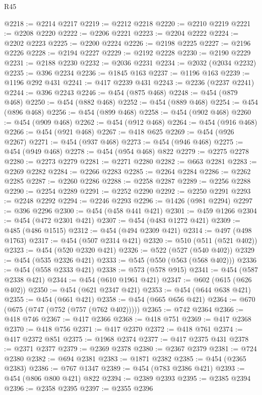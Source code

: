 \begin{lexlean}{R45}
\begin{coremodule}
@2218 := @2214 @2217
@2219 := @2212 @2218
@2220 := @2210 @2219
@2221 := @2208 @2220
@2222 := @2206 @2221
@2223 := @2204 @2222
@2224 := @2202 @2223
@2225 := @2200 @2224
@2226 := @2198 @2225
@2227 := @2196 @2226
@2228 := @2194 @2227
@2229 := @2192 @2228
@2230 := @2190 @2229
@2231 := @2188 @2230
@2232 := @2036 @2231
@2234 := @2032 (@2034 @2232)
@2235 := @396 @2234
@2236 := @1845 @163
@2237 := @1196 @163
@2239 := @1196 @292 @431
@2241 := @417 @2239 @431
@2243 := @2236 (@2237 @2241)
@2244 := @396 @2243
@2246 := @454 (@875 @468)
@2248 := @454 (@879 @468)
@2250 := @454 (@882 @468)
@2252 := @454 (@889 @468)
@2254 := @454 (@896 @468)
@2256 := @454 (@899 @468)
@2258 := @454 (@902 @468)
@2260 := @454 (@909 @468)
@2262 := @454 (@912 @468)
@2264 := @454 (@916 @468)
@2266 := @454 (@921 @468)
@2267 := @418 @625
@2269 := @454 (@926 @2267)
@2271 := @454 (@937 @468)
@2273 := @454 (@946 @468)
@2275 := @454 (@949 @468)
@2278 := @454 (@954 @468) @822
@2279 := @2275 @2278
@2280 := @2273 @2279
@2281 := @2271 @2280
@2282 := @663 @2281
@2283 := @2269 @2282
@2284 := @2266 @2283
@2285 := @2264 @2284
@2286 := @2262 @2285
@2287 := @2260 @2286
@2288 := @2258 @2287
@2289 := @2256 @2288
@2290 := @2254 @2289
@2291 := @2252 @2290
@2292 := @2250 @2291
@2293 := @2248 @2292
@2294 := @2246 @2293
@2296 := @1426 (@981 @2294)
@2297 := @396 @2296
@2300 := @454 (@458 @441 @421)
@2301 := @459 @1266
@2304 := @454 (@472 @2301 @421)
@2307 := @454 (@483 @1272 @421)
@2309 := @485 (@486 @1515)
@2312 := @454 (@494 @2309 @421)
@2314 := @497 (@498 @1763)
@2317 := @454 (@507 @2314 @421)
@2320 := @510 (@511 (@521 @402))
@2323 := @454 (@520 @2320 @421)
@2326 := @522 (@527 (@540 @402))
@2329 := @454 (@535 @2326 @421)
@2333 := @545 (@550 (@563 (@568 @402)))
@2336 := @454 (@558 @2333 @421)
@2338 := @573 (@578 @915)
@2341 := @454 (@587 @2338 @421)
@2344 := @454 (@610 @1961 @421)
@2347 := @602 (@615 (@626 @402))
@2350 := @454 (@621 @2347 @421)
@2353 := @454 (@644 @638 @421)
@2355 := @454 (@661 @421)
@2358 := @454 (@665 @656 @421)
@2364 := @670 (@675 (@747 (@752 (@757 (@762 @402)))))
@2365 := @742 @2364
@2366 := @418 @746
@2367 := @417 @2366
@2368 := @418 @751
@2369 := @417 @2368
@2370 := @418 @756
@2371 := @417 @2370
@2372 := @418 @761
@2374 := @417 @2372 @851
@2375 := @1968 @2374
@2377 := @417 @2375 @431
@2378 := @2371 @2377
@2379 := @2369 @2378
@2380 := @2367 @2379
@2381 := @724 @2380
@2382 := @694 @2381
@2383 := @1871 @2382
@2385 := @454 (@2365 @2383)
@2386 := @767 @1347
@2389 := @454 (@783 @2386 @421)
@2393 := @454 (@806 @800 @421) @822
@2394 := @2389 @2393
@2395 := @2385 @2394
@2396 := @2358 @2395
@2397 := @2355 @2396

\end{coremodule}
\end{lexlean}
